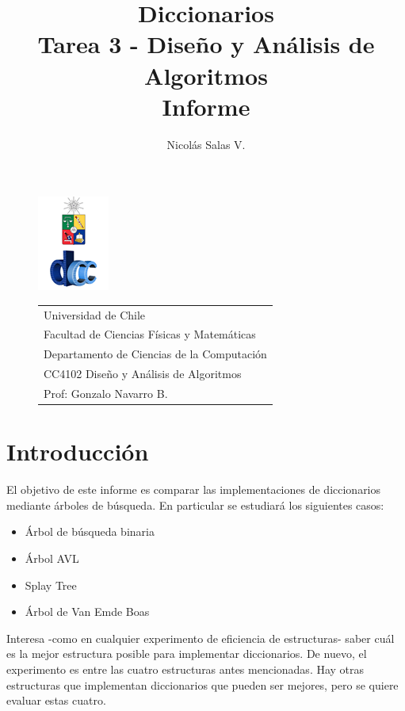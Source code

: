 \documentclass[12pt,letterpaper]{report}
\title{\Huge Diccionarios \\ Tarea 3 - Diseño y Análisis de Algoritmos \\ Informe}
\author{Nicolás Salas V.}
\begin{document}
\begin{figure}[t]
\includegraphics[scale=0.83]{logo.png}
\begin{tabular}{l}
\small Universidad de Chile\\
\small Facultad de Ciencias Físicas y Matemáticas\\
\small Departamento de Ciencias de la Computación\\
\small CC4102 Diseño y Análisis de Algoritmos\\
\small Prof: Gonzalo Navarro B.
\vspace{2.3cm}
\end{tabular}
\end{figure}

\maketitle

\tableofcontents
\newpage

\section{Introducción}
El objetivo de este informe es comparar las implementaciones de diccionarios mediante \'arboles de b\'usqueda. En particular se estudiar\'a los siguientes casos:

\begin{itemize}
\item \'Arbol de b\'usqueda binaria
\item \'Arbol AVL
\item Splay Tree
\item \'Arbol de Van Emde Boas
\end{itemize}

Interesa -como en cualquier experimento de eficiencia de estructuras- saber cu\'al es la mejor estructura posible para implementar diccionarios. De nuevo, el experimento es entre las cuatro estructuras antes mencionadas. Hay otras estructuras que implementan diccionarios que pueden ser mejores, pero se quiere evaluar estas cuatro.\\
\end{document}
